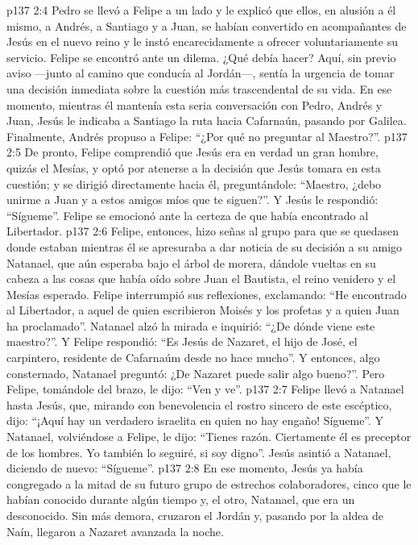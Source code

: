 \vs p137 2:4 Pedro se llevó a Felipe a un lado y le explicó que ellos, en alusión a él mismo, a Andrés, a Santiago y a Juan, se habían convertido en acompañantes de Jesús en el nuevo reino y le instó encarecidamente a ofrecer voluntariamente su servicio. Felipe se encontró ante un dilema. ¿Qué debía hacer? Aquí, sin previo aviso ---junto al camino que conducía al Jordán---, sentía la urgencia de tomar una decisión inmediata sobre la cuestión más trascendental de su vida. En ese momento, mientras él mantenía esta seria conversación con Pedro, Andrés y Juan, Jesús le indicaba a Santiago la ruta hacia Cafarnaún, pasando por Galilea. Finalmente, Andrés propuso a Felipe: “¿Por qué no preguntar al Maestro?”.
\vs p137 2:5 De pronto, Felipe comprendió que Jesús era en verdad un gran hombre, quizás el Mesías, y optó por atenerse a la decisión que Jesús tomara en esta cuestión; y se dirigió directamente hacia él, preguntándole: “Maestro, ¿debo unirme a Juan y a estos amigos míos que te siguen?”. Y Jesús le respondió: “Sígueme”. Felipe se emocionó ante la certeza de que había encontrado al Libertador.
\vs p137 2:6 \pc Felipe, entonces, hizo señas al grupo para que se quedasen donde estaban mientras él se apresuraba a dar noticia de su decisión a su amigo Natanael, que aún esperaba bajo el árbol de morera, dándole vueltas en su cabeza a las cosas que había oído sobre Juan el Bautista, el reino venidero y el Mesías esperado. Felipe interrumpió sus reflexiones, exclamando: “He encontrado al Libertador, a aquel de quien escribieron Moisés y los profetas y a quien Juan ha proclamado”. Natanael alzó la mirada e inquirió: “¿De dónde viene este maestro?”. Y Felipe respondió: “Es Jesús de Nazaret, el hijo de José, el carpintero, residente de Cafarnaúm desde no hace mucho”. Y entonces, algo consternado, Natanael preguntó: ¿De Nazaret puede salir algo bueno?”. Pero Felipe, tomándole del brazo, le dijo: “Ven y ve”.
\vs p137 2:7 Felipe llevó a Natanael hasta Jesús, que, mirando con benevolencia el rostro sincero de este escéptico, dijo: “¡Aquí hay un verdadero israelita en quien no hay engaño! Sígueme”. Y Natanael, volviéndose a Felipe, le dijo: “Tienes razón. Ciertamente él es preceptor de los hombres. Yo también lo seguiré, si soy digno”. Jesús asintió a Natanael, diciendo de nuevo: “Sígueme”.
\vs p137 2:8 \pc En ese momento, Jesús ya había congregado a la mitad de su futuro grupo de estrechos colaboradores, cinco que le habían conocido durante algún tiempo y, el otro, Natanael, que era un desconocido. Sin más demora, cruzaron el Jordán y, pasando por la aldea de Naín, llegaron a Nazaret avanzada la noche.
